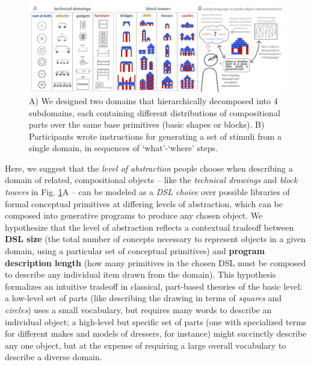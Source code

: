 \documentclass[10pt,letterpaper]{article}
\begin{document}
\begin{figure}[h]
  \begin{center}
  \includegraphics[width=0.99\linewidth]{figures/lax_task.pdf}
  \caption{A) We designed two domains that hierarchically decomposed into 4 subdomains, each containing different distributions of compositional parts over the same base primitives (basic shapes or blocks). B) Participants wrote instructions for generating a set of stimuli from a single domain, in sequences of `what'-`where' steps.}
  \label{fig:task}
  \end{center}
 \end{figure}

Here, we suggest that the \textit{level of abstraction} people choose when describing a domain of related, compositional objects -- like the \textit{technical drawings} and \textit{block towers} in Fig. \ref{fig:task}A -- can be modeled as a \textit{DSL choice} over possible libraries of formal conceptual primitives at differing levels of abstraction, which can be composed into generative programs to produce any chosen object. We hypothesize that the level of abstraction reflects a contextual tradeoff between \textbf{DSL size} (the total number of concepts necessary to represent objects in a given domain, using a particular set of conceptual primitives) and \textbf{program description length} (how many primitives in the chosen DSL must be composed to describe any individual item drawn from the domain). This hypothesis formalizes an intuitive tradeoff in classical, part-based theories of the basic level: a low-level set of parts (like describing the drawing in terms of \textit{squares} and \textit{circles}) uses a small vocabulary, but requires  many words to describe an individual object; a high-level but specific set of parts (one with specialized terms for different makes and models of dressers, for instance) might succinctly describe any one object, but at the expense of requiring a large overall vocabulary to describe a diverse domain.
\end{document}
